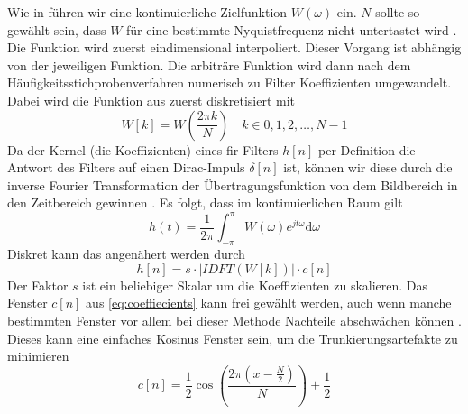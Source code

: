 Wie in \autocite{noise-shaping} führen wir eine kontinuierliche Zielfunktion $W(\omega)$ ein.
$N$ sollte so gewählt sein, dass $W$ für eine bestimmte Nyquistfrequenz \autocite{shannon} nicht untertastet wird \autocite{SASPWEB2011}.
Die Funktion wird zuerst eindimensional interpoliert.
Dieser Vorgang ist abhängig von der jeweiligen Funktion.
Die arbiträre Funktion wird dann nach dem Häufigkeitsstichprobenverfahren numerisch zu Filter Koeffizienten umgewandelt.
Dabei wird die Funktion aus \autocite{frequency-sampling-method} zuerst diskretisiert mit
\begin{equation}
W[k] = W \left( \frac{2\pi k}{N} \right) \quad k \in 0,1,2,\ldots,N-1
\end{equation}
Da der Kernel (die Koeffizienten) eines \gls{fir} Filters $h[n]$ per Definition die Antwort des Filters auf einen Dirac-Impuls $\delta[n]$ ist, können wir diese durch die inverse Fourier Transformation der Übertragungsfunktion von dem Bildbereich in den Zeitbereich gewinnen \autocites{frequency-sampling-method}{frequency-sampling-method-2}{SASPWEB2011}.
Es folgt, dass im kontinuierlichen Raum gilt
\begin{equation}
h(t) = \frac{1}{2\pi} \int_{-\pi}^{\pi} W(\omega) e^{j t \omega} \text{d} \omega
\end{equation}
Diskret kann das angenähert werden durch
\begin{equation}
h[n] = s \cdot \left| \textit{IDFT} \left( W[k] \right) \right| \cdot c[n]
\label{eq:coeffiecients}
\end{equation}
Der Faktor $s$ ist ein beliebiger Skalar um die Koeffizienten zu skalieren.
Das Fenster $c[n]$ aus \autoref{eq:coeffiecients} kann frei gewählt werden, auch wenn manche bestimmten Fenster vor allem bei dieser Methode Nachteile abschwächen können \autocite{frequency-sampling-method-2}.
Dieses kann eine einfaches Kosinus Fenster sein, um die Trunkierungsartefakte zu minimieren
\begin{equation}
c[n] = \frac{1}{2} \cos \left( \frac{2\pi \left( x - \frac{N}{2}\right) }{N}\right) + \frac{1}{2}
\end{equation}

